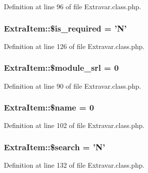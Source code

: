 Definition at line 96 of file Extravar.\+class.\+php.

\hypertarget{classExtraItem_a616da9975ea87e9b61b6b9a2daf5e769}{
\subsubsection[{\$is\+\_\+required}]{\setlength{\rightskip}{0pt plus 5cm}Extra\+Item\+::\$is\+\_\+required = 'N'}}\label{classExtraItem_a616da9975ea87e9b61b6b9a2daf5e769}


Definition at line 126 of file Extravar.\+class.\+php.

\hypertarget{classExtraItem_a21cce86c0846b13228273314216e5ab9}{
\subsubsection[{\$module\+\_\+srl}]{\setlength{\rightskip}{0pt plus 5cm}Extra\+Item\+::\$module\+\_\+srl = 0}}\label{classExtraItem_a21cce86c0846b13228273314216e5ab9}


Definition at line 90 of file Extravar.\+class.\+php.

\hypertarget{classExtraItem_a32694a2408e9e2cca1d680356cf937d3}{
\subsubsection[{\$name}]{\setlength{\rightskip}{0pt plus 5cm}Extra\+Item\+::\$name = 0}}\label{classExtraItem_a32694a2408e9e2cca1d680356cf937d3}


Definition at line 102 of file Extravar.\+class.\+php.

\hypertarget{classExtraItem_a086e30bc8e2d078ad1108d00ae58a60c}{
\subsubsection[{\$search}]{\setlength{\rightskip}{0pt plus 5cm}Extra\+Item\+::\$search = 'N'}}\label{classExtraItem_a086e30bc8e2d078ad1108d00ae58a60c}


Definition at line 132 of file Extravar.\+class.\+php.

